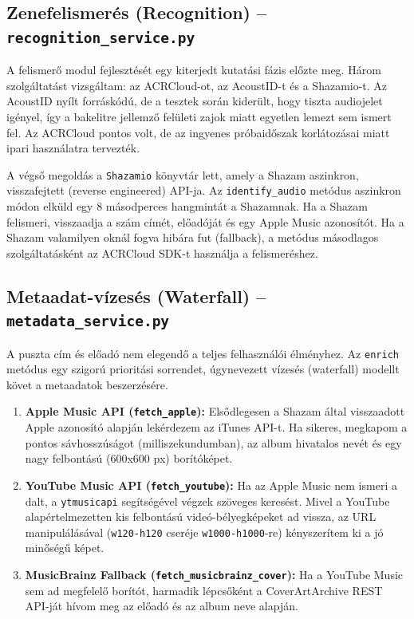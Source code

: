 \pagebreak

\subsection{Zenefelismerés (Recognition) -- \texttt{recognition\_service.py}}
A felismerő modul fejlesztését egy kiterjedt kutatási fázis előzte meg. Három szolgáltatást vizsgáltam: az ACRCloud-ot, az AcoustID-t és a Shazamio-t. Az AcoustID nyílt forráskódú, de a tesztek során kiderült, hogy tiszta audiojelet igényel, így a bakelitre jellemző felületi zajok miatt egyetlen lemezt sem ismert fel. Az ACRCloud pontos volt, de az ingyenes próbaidőszak korlátozásai miatt ipari használatra tervezték.

A végső megoldás a \texttt{Shazamio} \cite{shazamio} könyvtár lett, amely a Shazam aszinkron, visszafejtett (reverse engineered) API-ja. Az \texttt{identify\_audio} metódus aszinkron módon elküld egy 8 másodperces hangmintát a Shazamnak. Ha a Shazam felismeri, visszaadja a szám címét, előadóját és egy Apple Music azonosítót. Ha a Shazam valamilyen oknál fogva hibára fut (fallback), a metódus másodlagos szolgáltatásként az ACRCloud SDK-t használja a felismeréshez.

\subsection{Metaadat-vízesés (Waterfall) -- \texttt{metadata\_service.py}}
A puszta cím és előadó nem elegendő a teljes felhasználói élményhez. Az \texttt{enrich} metódus egy szigorú prioritási sorrendet, úgynevezett vízesés (waterfall) modellt követ a metaadatok beszerzésére.

\begin{enumerate}
    \item \textbf{Apple Music API (\texttt{fetch\_apple}):} Elsődlegesen a Shazam által visszaadott Apple azonosító alapján lekérdezem az iTunes API-t. Ha sikeres, megkapom a pontos sávhosszúságot (milliszekundumban), az album hivatalos nevét és egy nagy felbontású (600x600 px) borítóképet.
    \item \textbf{YouTube Music API (\texttt{fetch\_youtube}):} Ha az Apple Music nem ismeri a dalt, a \texttt{ytmusicapi} segítségével végzek szöveges keresést. Mivel a YouTube alapértelmezetten kis felbontású videó-bélyegképeket ad vissza, az URL manipulálásával (\texttt{w120-h120} cseréje \texttt{w1000-h1000}-re) kényszerítem ki a jó minőségű képet.
    \item \textbf{MusicBrainz Fallback (\texttt{fetch\_musicbrainz\_cover}):} Ha a YouTube Music sem ad megfelelő borítót, harmadik lépcsőként a CoverArtArchive REST API-ját hívom meg az előadó és az album neve alapján.
\end{enumerate}

